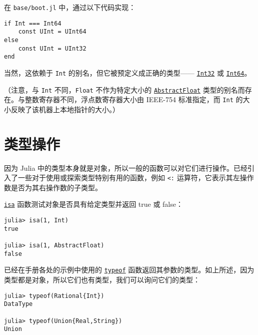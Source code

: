 在 \texttt{base/boot.jl} 中，通过以下代码实现：




\begin{verbatim}
if Int === Int64
    const UInt = UInt64
else
    const UInt = UInt32
end
\end{verbatim}



当然，这依赖于 \texttt{Int} 的别名，但它被预定义成正确的类型—— \hyperlink{10103694114785108551}{\texttt{Int32}} 或 \hyperlink{7720564657383125058}{\texttt{Int64}}。



（注意，与 \texttt{Int} 不同，\texttt{Float} 不作为特定大小的 \hyperlink{11465394427882483091}{\texttt{AbstractFloat}} 类型的别名而存在。与整数寄存器不同，浮点数寄存器大小由 IEEE-754 标准指定，而 \texttt{Int} 的大小反映了该机器上本地指针的大小。）



\hypertarget{17381545984694686313}{}


\section{类型操作}



因为 Julia 中的类型本身就是对象，所以一般的函数可以对它们进行操作。已经引入了一些对于使用或探索类型特别有用的函数，例如 \texttt{<:} 运算符，它表示其左操作数是否为其右操作数的子类型。



\hyperlink{7066325108767373297}{\texttt{isa}} 函数测试对象是否具有给定类型并返回 true 或 false：




\begin{verbatim}
julia> isa(1, Int)
true

julia> isa(1, AbstractFloat)
false
\end{verbatim}



已经在手册各处的示例中使用的 \hyperlink{13440452181855594120}{\texttt{typeof}} 函数返回其参数的类型。如上所述，因为类型都是对象，所以它们也有类型，我们可以询问它们的类型：




\begin{verbatim}
julia> typeof(Rational{Int})
DataType

julia> typeof(Union{Real,String})
Union
\end{verbatim}



